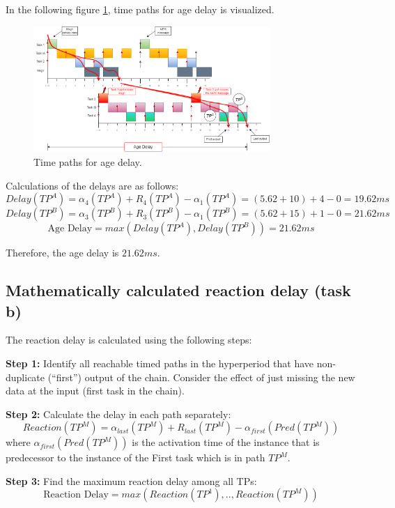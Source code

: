             In the following figure \ref{fig:agedelaypaths}, time paths for age delay is visualized.

            \begin{figure}[H]
                \centering
                \includegraphics[width=0.8\textwidth]{images/TimedPathAgeDelay.png}
                \caption{Time paths for age delay.}
                \label{fig:agedelaypaths}  
            \end{figure}

            Calculations of the delays are as follows:
            $$Delay(TP^A) = \alpha_4(TP^A) + R_4(TP^A) - \alpha_1(TP^A) = (5.62+10) + 4 - 0 = 19.62ms$$
            $$Delay(TP^B) = \alpha_3(TP^B) + R_3(TP^B) - \alpha_1(TP^B) = (5.62+15) + 1 - 0 = 21.62ms$$
            $$\text{Age Delay} = max(Delay(TP^A), Delay(TP^B)) = 21.62ms$$

            Therefore, the age delay is $21.62ms$.

        \subsection*{\textbf{Mathematically calculated reaction delay (task b)}}
            The reaction delay is calculated using the following steps:

            \textbf{Step 1:} Identify all reachable timed paths in the hyperperiod that have non-duplicate (“first”) output of the chain. Consider the effect of just missing the new data at the input (first task in the chain).

            \textbf{Step 2:} Calculate the delay in each path separately:
            $$Reaction(TP^M) = \alpha_{last}(TP^M) + R_{last}(TP^M) - \alpha_{first}(Pred(TP^M))$$
            where $\alpha_{first}(Pred(TP^M))$ is the activation time of the instance that is predecessor to the instance of the First task
            which is in path $TP^M$.

            \textbf{Step 3:} Find the maximum reaction delay among all TPs: 
            $$\text{Reaction Delay} = max(Reaction(TP^1),..,Reaction(TP^M))$$

